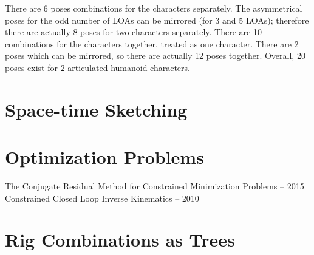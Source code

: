 There are 6 poses combinations for the characters separately. The asymmetrical poses for the odd number of LOAs can be mirrored (for 3 and 5 LOAs); therefore there are actually 8 poses for two characters separately. There are 10 combinations for the characters together, treated as one character. There are 2 poses which can be mirrored, so there are actually 12 poses together. Overall, 20 poses exist for 2 articulated humanoid characters.

\section{Space-time Sketching}


\section{Optimization Problems}
The Conjugate Residual Method for Constrained Minimization Problems -- 2015\\
Constrained Closed Loop Inverse Kinematics -- 2010

\section{Rig Combinations as Trees}
